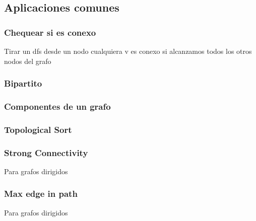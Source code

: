 \newpage
\subsection{Aplicaciones comunes}

\subsubsection{Chequear si es conexo}
Tirar un dfs desde un nodo cualquiera v
es conexo si alcanzamos todos los otros nodos del grafo

\subsubsection{Bipartito}


\subsubsection{Componentes de un grafo}


\subsubsection{Topological Sort}


\newpage
\subsubsection{Strong Connectivity}
Para grafos dirigidos


\subsubsection{Max edge in path}
Para grafos dirigidos


